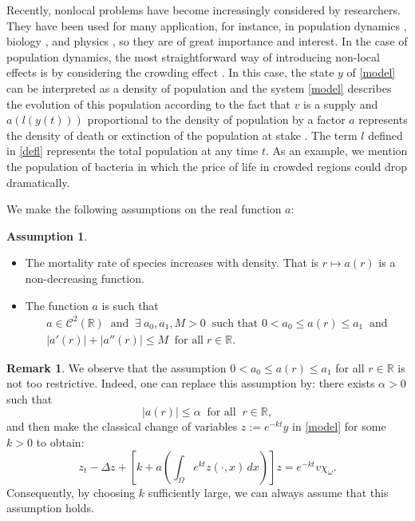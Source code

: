 \documentclass[reqno,twoside]{amsart}
\numberwithin{equation}{section}
\theoremstyle{definition}
\newtheorem{remark}[theorem]{Remark}
\newtheorem{assumption}[theorem]{Assumption}
\numberwithin{equation}{section}
\def \dis {\displaystyle}
\def \R {\mathbb{R}}
\def \R {\mathbb{R}}
\begin{document}
Recently, nonlocal problems have become increasingly considered by researchers. They have been
used for many application, for instance, in population dynamics \cite{chipot2000, chipot1999, correa2010,furter1989}, biology \cite{calsina1995, szymanska2009},  and physics \cite{chafee1981,lacey1995}, so they are of great importance and interest.  In the case of population dynamics, the most straightforward way of introducing non-local effects is by considering the crowding effect \cite{furter1989}. In this case, the state $y$ of \eqref{model} can be interpreted as a density of population and the system \eqref{model} describes the evolution of this population according to the fact that $v$ is a supply and $a\left(l(y(t))\right)$ proportional to the density of population by a factor $a$ represents the density of death or extinction of the population at stake \cite{chang2003a}. The term $l$ defined in \eqref{defl} represents the total population at any time $t$. As an example, we mention the population of bacteria in which the price of life in crowded regions could drop dramatically. \par
We make the following assumptions on the real function $a$:
\begin{assumption}\label{ass1}
	$ $
	\begin{itemize}
		\item The mortality rate of species increases with density. That is $r\mapsto a(r)$ is a non-decreasing function.
		\item The function $a$ is such that
		\begin{equation}\label{as1}
			\begin{array}{llll}
				\dis a\in \mathcal{C}^2(\R) \;\; \text{and} \;\; \exists \ a_0,a_1,M>0 \;\;\text{such that}\, \, 0<a_0\leq a(r)\leq a_1 \;\;\text{and}\\
				|a'(r)|+|a''(r)|\leq M \;\; \text{for all}\; r\in \R.
			\end{array}
		\end{equation}
	\end{itemize}
\end{assumption}
\begin{remark} We observe that the assumption $0 <  a_0 \leq a(r) \leq a_1$ for all $r\in \R$ is not too restrictive. Indeed, one can replace this assumption by: there exists $\alpha>0$ such that 
	\begin{equation*}
		|a(r)|\leq \alpha \;\;\text{for all}\;\; r\in \R,
	\end{equation*}
	and then make the classical change of variables $z:=e^{-kt}y$ in \eqref{model} for some $k>0$ to obtain:
	$$ \dis z_{t}-\Delta z+\left[k+a\left(\int_{\Omega}e^{kt}z(\cdot,x)\,dx\right)\right]z =e^{-kt}v\chi_{\omega}.$$
	Consequently, by choosing $k$ sufficiently large, we can always assume that this assumption holds.
\end{remark}
\end{document}
